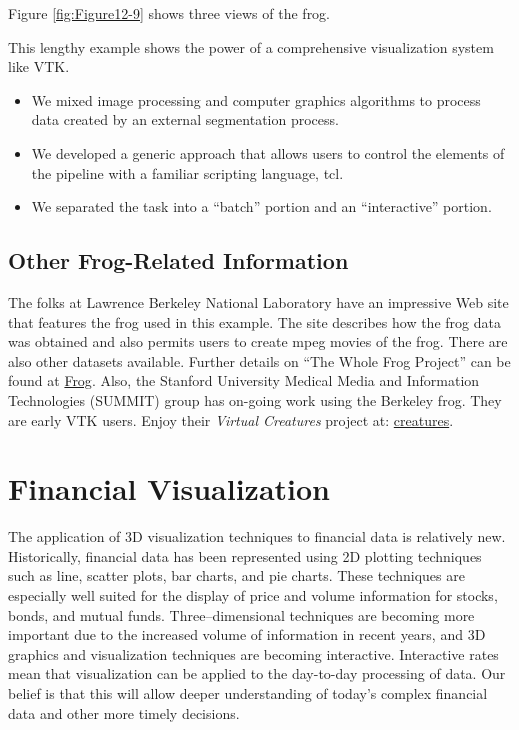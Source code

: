 Figure \ref{fig:Figure12-9} shows three views of the frog.

This lengthy example shows the power of a comprehensive visualization system like VTK.

\begin{itemize}

    \item We mixed image processing and computer graphics algorithms to process data created by an external segmentation process.

    \item We developed a generic approach that allows users to control the elements of the pipeline with a familiar scripting language, tcl.

    \item We separated the task into a ``batch'' portion and an ``interactive'' portion.

\end{itemize}

\subsection{Other Frog-Related Information}

The folks at Lawrence Berkeley National Laboratory have an impressive Web site that features the frog used in this example. The site describes how the frog data was obtained and also permits users to create mpeg movies of the frog. There are also other datasets available. Further details on ``The Whole Frog Project'' can be found at \href{http://www-itg.lbl.gov/Frog}{Frog}. Also, the Stanford University Medical Media and Information Technologies (SUMMIT) group has on-going work using the Berkeley frog. They are early VTK users. Enjoy their \emph{Virtual Creatures} project at: \href{http://summit.stanford.edu/creatures}{creatures}.

\section{Financial Visualization}

The application of 3D visualization techniques to financial data is relatively new. Historically, financial data has been represented using 2D plotting techniques such as line, scatter plots, bar charts, and pie charts. These techniques are especially well suited for the display of price and volume information for stocks, bonds, and mutual funds. Three--dimensional techniques are becoming more important due to the increased volume of information in recent years, and 3D graphics and visualization techniques are becoming interactive. Interactive rates mean that visualization can be applied to the day-to-day processing of data. Our belief is that this will allow deeper understanding of today's complex financial data and other more timely decisions.

